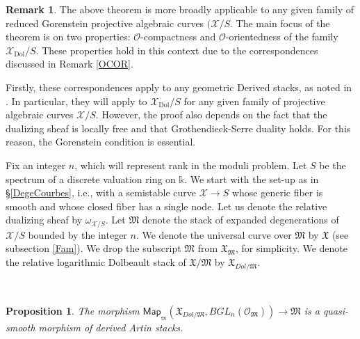 \documentclass[11pt]{amsart}
\newcommand {\map} {\mathsf{Map}}
\theoremstyle{plain}
\numberwithin{equation}{section}
\theoremstyle{definition}
\newtheorem{Rem}[Def]{Remark}
\theoremstyle{plain}
\newtheorem{Prop}[Def]{Proposition}
\begin{document}
\medskip

\begin{Rem} \label{Remqq}
The above theorem is more broadly applicable to any given family of reduced Gorenstein projective algebraic curves $(\mathcal{X}/S$. The main focus of the theorem is on two properties: $\mathcal{O}$-compactness and $\mathcal{O}$-orientedness of the family $\mathcal{X}_{\text{Dol}}/S$. These properties hold in this context due to the correspondences discussed in Remark \ref{OCOR}. 

Firstly, these correspondences apply to any geometric Derived stacks, as noted in \cite[Section 5.1]{PS}. In particular, they will apply to $\mathcal{X}_{\text{Dol}}/S$ for any given family of projective algebraic curves $\mathcal{X}/S$. However, the proof also depends on the fact that the dualizing sheaf is locally free and that Grothendieck-Serre duality holds. For this reason, the Gorenstein condition is essential.
\end{Rem}

\bigskip

Fix an integer $n$, which will represent rank in the moduli problem. Let $S$ be the spectrum of a discrete valuation ring on $\mathbb k$. We start with the set-up as in \S \ref{DegeCourbes}, i.e., with a semistable curve $\mathcal{X} \to S$ whose generic fiber is smooth and whose closed fiber has a single node. Let us denote the relative dualizing sheaf by $\omega_{\mathcal X/S}$. Let $\mathfrak M$ denote the stack of expanded degenerations of $\mathcal{X}/S$  bounded by the integer $n$. We denote the universal curve over $\mathfrak M$ by $\mathfrak{X}$ (see subsection \ref{Fam}). We drop the subscript $\mathfrak M$ from $\mathfrak X_{\mathfrak M}$, for simplicity. We denote the relative logarithmic Dolbeault stack of $\mathfrak{X}/\mathfrak{M}$  by $\mathfrak X_{Dol/\mathfrak{M}}$.

\

\begin{Prop}\label{qs11}
The morphism $\map_{_{\mathfrak M}}(\mathfrak{X}_{Dol/\mathfrak{M}}, BGL_n(\mathcal{O}_{\mathfrak M})) \longrightarrow \mathfrak M$ is a quasi-smooth morphism of derived Artin stacks.
\end{Prop}
\end{document}
